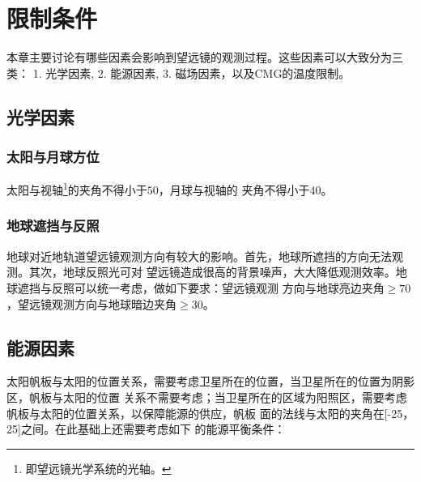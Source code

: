 
\chapter{限制条件}
本章主要讨论有哪些因素会影响到望远镜的观测过程。这些因素可以大致分为三类：
1. 光学因素, 2. 能源因素, 3. 磁场因素，以及CMG的温度限制。


\section{光学因素}

\subsection{太阳与月球方位}
太阳与视轴\footnote{即望远镜光学系统的光轴。}的夹角不得小于$50$\textdegree，月球与视轴的
夹角不得小于$40$\textdegree。

\subsection{地球遮挡与反照}
地球对近地轨道望远镜观测方向有较大的影响。首先，地球所遮挡的方向无法观测。其次，地球反照光可对
望远镜造成很高的背景噪声，大大降低观测效率。地球遮挡与反照可以统一考虑，做如下要求：望远镜观测
方向与地球亮边夹角$\ge70$\textdegree，望远镜观测方向与地球暗边夹角$\ge30$\textdegree。



\section{能源因素}
太阳帆板与太阳的位置关系，需要考虑卫星所在的位置，当卫星所在的位置为阴影区，帆板与太阳的位置
关系不需要考虑；当卫星所在的区域为阳照区，需要考虑帆板与太阳的位置关系，以保障能源的供应，帆板
面的法线与太阳的夹角在[-25\textdegree，25\textdegree]之间。在此基础上还需要考虑如下
的能源平衡条件：

